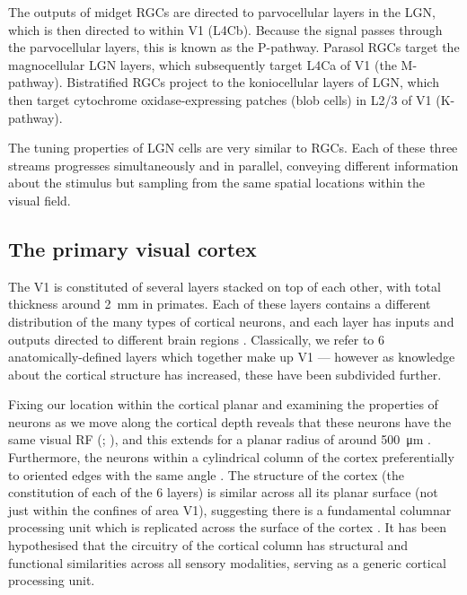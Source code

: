 The outputs of midget \acp{RGC} are directed to parvocellular layers in the \ac{LGN}, which is then directed to  within \ac{V1} (\acs{L4Cb}).
Because the signal passes through the parvocellular layers, this is known as the P-pathway.
Parasol \acp{RGC} target the magnocellular \ac{LGN} layers, which subsequently target \acs{L4Ca} of \ac{V1} (the M-pathway).
Bistratified \acp{RGC} project to the koniocellular layers of \ac{LGN}, which then target cytochrome oxidase-expressing patches (blob cells) in \acs{L2/3} of \ac{V1} (K-pathway).

The tuning properties of \ac{LGN} cells are very similar to \acp{RGC}.
Each of these three streams progresses simultaneously and in parallel, conveying different information about the stimulus but sampling from the same spatial locations within the visual field.


\subsection{The primary visual cortex}
\label{sec:bg_v1}

The \acf{V1} is constituted of several layers stacked on top of each other, with total thickness around \SI{2}{\milli\metre} in primates.
Each of these layers contains a different distribution of the many types of cortical neurons, and each layer has inputs and outputs directed to different brain regions \citep{Harris2013}.
Classically, we refer to \num{6} anatomically-defined layers which together make up \ac{V1} --- however as knowledge about the cortical structure has increased, these have been subdivided further.

Fixing our location within the cortical planar and examining the properties of neurons as we move along the cortical depth reveals that these neurons have the same visual \ac{RF} (\citealp{Hubel1962}; \citealp{Hubel1963}), and this extends for a planar radius of around \SI{500}{\micro\metre} \citep{Mountcastle1997}.
Furthermore, the neurons within a cylindrical column of the cortex preferentially to oriented edges with the same angle \citep{Hubel1962}.
The structure of the cortex (the constitution of each of the 6 layers) is similar across all its planar surface (not just within the confines of area \ac{V1}), suggesting there is a fundamental columnar processing unit which is replicated across the surface of the cortex \citep{Mountcastle1957}.
It has been hypothesised that the circuitry of the cortical column has structural and functional similarities across all sensory modalities, serving as a generic cortical processing unit.

